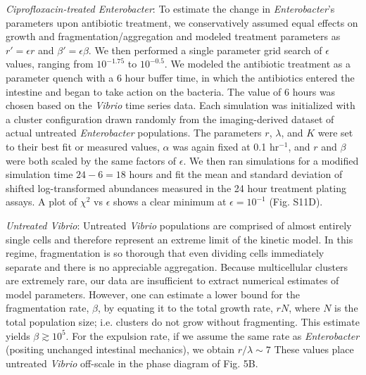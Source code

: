 \documentclass[12pt]{article}
\begin{document}
\textit{Ciprofloxacin-treated Enterobacter}:  To estimate the change in \textit{Enterobacter}'s parameters upon antibiotic treatment, we conservatively assumed equal effects on growth and fragmentation/aggregation and modeled treatment parameters as $r' = \epsilon r$ and $\beta' = \epsilon \beta$. We then performed a single parameter grid search of $\epsilon$ values, ranging from $10^{-1.75}$ to $10^{-0.5}$. We modeled the antibiotic treatment as a parameter quench with a 6 hour buffer time, in which the antibiotics entered the intestine and began to take action on the bacteria. The value of 6 hours was chosen based on the \textit{Vibrio} time series data. Each simulation was initialized with a cluster configuration drawn randomly from the imaging-derived dataset of actual untreated \textit{Enterobacter} populations. The parameters $r$, $\lambda$, and $K$ were set to their best fit or measured values, $\alpha$ was again fixed at 0.1 hr$^{-1}$, and  $r$ and $\beta$ were both scaled by the same factors of $\epsilon$. We then ran simulations for a modified simulation time $24 - 6 = 18$ hours and fit the mean and standard deviation of shifted log-transformed abundances measured in the 24 hour treatment plating assays. A plot of $\chi^2$ vs $\epsilon$ shows a clear minimum at $\epsilon = 10^{-1}$ (Fig. S11D).

\textit{Untreated Vibrio}: Untreated \textit{Vibrio} populations are comprised of almost entirely single cells and therefore represent an extreme limit of the kinetic model. In this regime, fragmentation is so thorough that even dividing cells immediately separate and there is no appreciable aggregation. Because multicellular clusters are extremely rare, our data are insufficient to extract numerical estimates of model parameters. However, one can estimate a lower bound for the fragmentation rate, $\beta$, by equating it to the total growth rate, $rN$, where $N$ is the total population size; i.e. clusters do not grow without fragmenting. This estimate yields $\beta \gtrsim 10^5$. For the expulsion rate, if we assume the same rate as \textit{Enterobacter} (positing unchanged intestinal mechanics), we obtain $r/\lambda \sim 7$ These values place untreated \textit{Vibrio} off-scale in the phase diagram of Fig. 5B.
 
\end{document}
